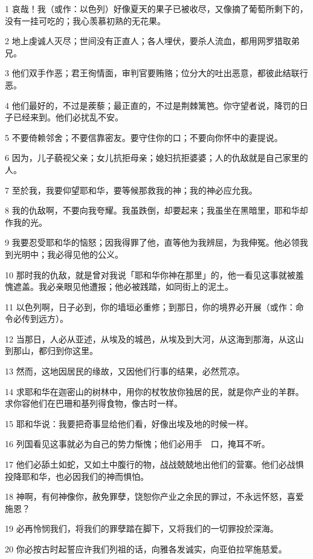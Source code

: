\par 1 哀哉！我（或作：以色列）好像夏天的果子已被收尽，又像摘了葡萄所剩下的，没有一挂可吃的；我心羡慕初熟的无花果。
\par 2 地上虔诚人灭尽；世间没有正直人；各人埋伏，要杀人流血，都用网罗猎取弟兄。
\par 3 他们双手作恶；君王徇情面，审判官要贿赂；位分大的吐出恶意，都彼此结联行恶。
\par 4 他们最好的，不过是蒺藜；最正直的，不过是荆棘篱笆。你守望者说，降罚的日子已经来到。他们必扰乱不安。
\par 5 不要倚赖邻舍；不要信靠密友。要守住你的口；不要向你怀中的妻提说。
\par 6 因为，儿子藐视父亲；女儿抗拒母亲；媳妇抗拒婆婆；人的仇敌就是自己家里的人。
\par 7 至於我，我要仰望耶和华，要等候那救我的神；我的神必应允我。
\par 8 我的仇敌啊，不要向我夸耀。我虽跌倒，却要起来；我虽坐在黑暗里，耶和华却作我的光。
\par 9 我要忍受耶和华的恼怒；因我得罪了他，直等他为我辨屈，为我伸冤。他必领我到光明中；我必得见他的公义。
\par 10 那时我的仇敌，就是曾对我说「耶和华你神在那里」的，他一看见这事就被羞愧遮盖。我必亲眼见他遭报；他必被践踏，如同街上的泥土。
\par 11 以色列啊，日子必到，你的墙垣必重修；到那日，你的境界必开展（或作：命令必传到远方）。
\par 12 当那日，人必从亚述，从埃及的城邑，从埃及到大河，从这海到那海，从这山到那山，都归到你这里。
\par 13 然而，这地因居民的缘故，又因他们行事的结果，必然荒凉。
\par 14 求耶和华在迦密山的树林中，用你的杖牧放你独居的民，就是你产业的羊群。求你容他们在巴珊和基列得食物，像古时一样。
\par 15 耶和华说：我要把奇事显给他们看，好像出埃及地的时候一样。
\par 16 列国看见这事就必为自己的势力惭愧；他们必用手　口，掩耳不听。
\par 17 他们必舔土如蛇，又如土中腹行的物，战战兢兢地出他们的营寨。他们必战惧投降耶和华，也必因我们的神而惧怕。
\par 18 神啊，有何神像你，赦免罪孽，饶恕你产业之余民的罪过，不永远怀怒，喜爱施恩？
\par 19 必再怜悯我们，将我们的罪孽踏在脚下，又将我们的一切罪投於深海。
\par 20 你必按古时起誓应许我们列祖的话，向雅各发诚实，向亚伯拉罕施慈爱。


